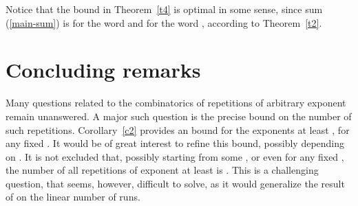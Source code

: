 \documentclass[11pt]{article}
\begin{document}
Notice that the bound in Theorem~\ref{t4} is optimal in some sense, since
sum (\ref{main-sum}) is  for the word  and  for the word
, according to
Theorem~\ref{t2}. 

\section{Concluding remarks}

Many questions related to the combinatorics of repetitions of
arbitrary exponent remain unanswered. A major such question is the
precise bound on the number of such repetitions. Corollary~\ref{c2}
provides an  bound for the exponents at least
, for any fixed . It would be of great
interest to refine this bound, possibly depending on . It
is not excluded that, possibly starting from some , or
even for any fixed , the number of all repetitions of
exponent at least  is . This is a challenging
question, that seems, however, difficult to solve, as it would
generalize the result of
\cite{KolpakovKucherovFCT99,KolpakovKucherovJDA00} on the linear
number of runs.


\end{document}
